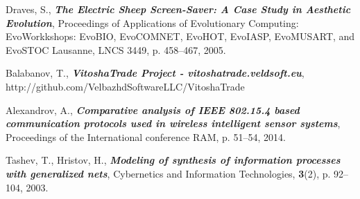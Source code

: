 \documentclass[runningheads]{llncs}
\begin{document}
\begin{thebibliography}{8}
 Draves, S., \textbf{\textit{The Electric Sheep Screen-Saver: A Case Study in Aesthetic Evolution}}, Proceedings of Applications of Evolutionary Computing: EvoWorkkshops: EvoBIO, EvoCOMNET, EvoHOT, EvoIASP, EvoMUSART, and EvoSTOC Lausanne, LNCS 3449, p. 458--467, 2005.

 Balabanov, T., \textbf{\textit{VitoshaTrade Project - vitoshatrade.veldsoft.eu}}, http://github.com/VelbazhdSoftwareLLC/VitoshaTrade

 Alexandrov, A., \textbf{\textit{Comparative analysis of IEEE 802.15.4 based communication protocols used in wireless intelligent sensor systems}}, Proceedings of the International conference RAM, p. 51--54, 2014.

 Tashev, T., Hristov, H., \textbf{\textit{Modeling of synthesis of information processes with generalized nets}}, Cybernetics and Information Technologies, \textbf{3}(2), p. 92--104, 2003.
\end{thebibliography}
\end{document}
